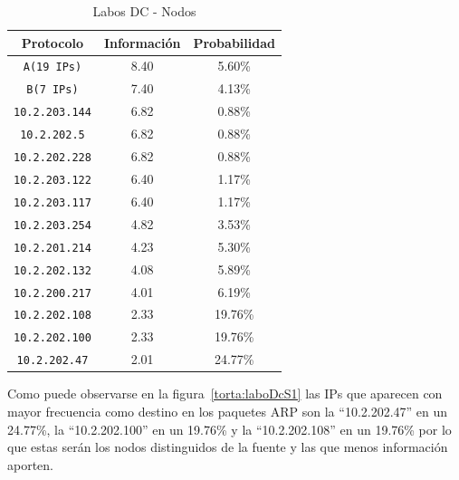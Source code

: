 \documentclass[final,inline,narroweqnarray,a4paper]{ieee}
\begin{document}
\begin{table}[H]
    \begin{center}
        \begin{tabular}{|c|c|c|}
            \hline
            \textbf{Protocolo} & \textbf{Información} & \textbf{Probabilidad} \\ \hline
            \texttt{A(19 IPs)}    &8.40        & 5.60\%     \\ \hline
            \texttt{B(7 IPs)}     &7.40        & 4.13\%     \\ \hline
            \texttt{10.2.203.144} &6.82        & 0.88\%     \\ \hline
            \texttt{10.2.202.5}   &6.82        & 0.88\%     \\ \hline
            \texttt{10.2.202.228} &6.82        & 0.88\%     \\ \hline
            \texttt{10.2.203.122} &6.40        & 1.17\%     \\ \hline
            \texttt{10.2.203.117} &6.40        & 1.17\%     \\ \hline
            \texttt{10.2.203.254} &4.82        & 3.53\%     \\ \hline
            \texttt{10.2.201.214} &4.23        & 5.30\%     \\ \hline
            \texttt{10.2.202.132} &4.08        & 5.89\%     \\ \hline
            \texttt{10.2.200.217} &4.01        & 6.19\%     \\ \hline
            \texttt{10.2.202.108} &2.33        & 19.76\%     \\ \hline
            \texttt{10.2.202.100} &2.33        & 19.76\%     \\ \hline
            \texttt{10.2.202.47}  &2.01        & 24.77\%     \\ \hline   
        \end{tabular}
        \caption{Labos DC - Nodos}
        \label{table:laboDcS1}
    \end{center}
\end{table}

Como puede observarse en la figura~\ref{torta:laboDcS1} las IPs que aparecen con mayor frecuencia como destino en los paquetes ARP son la ``10.2.202.47'' en un 24.77\%, la ``10.2.202.100'' en un 19.76\% y la ``10.2.202.108'' en un 19.76\% por lo que estas serán los nodos distinguidos de la fuente y las que menos información aporten.
\end{document}
